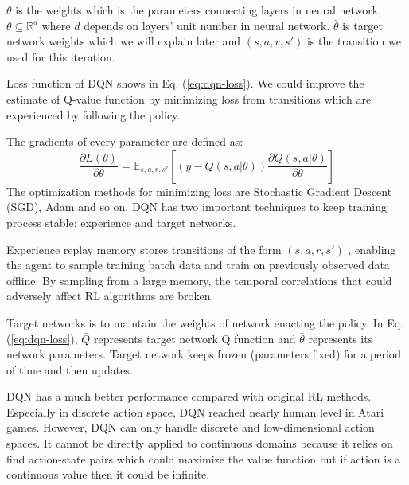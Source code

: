\documentclass[11pt,twocolumn]{jarticle} %
\begin{document}
$\theta$ is the weights which is the parameters connecting layers in neural network, $\theta \subseteq \mathbb{R}^d$ where $d$ depends on layers' unit number in neural network. $\bar{\theta}$ is target network weights which we will explain later and $(s,a,r,s')$ is the transition we used for this iteration. \par

Loss function of DQN shows in Eq. (\ref{eq:dqn-loss}). We could improve the estimate of Q-value function by minimizing loss from transitions which are experienced by following the policy. \par
The gradients of every parameter are defined as:
\begin{equation}
\frac{\partial L(\theta)}{\partial \theta} = \mathbb{E}_{s,a,r,s'}[(y - Q(s, a|\theta))\frac{\partial Q(s, a|\theta)}{\partial \theta}]
\end{equation}
The optimization methods for minimizing loss are Stochastic Gradient Descent (SGD), Adam\cite{adam} and so on.
DQN has two important techniques to keep training process stable: experience and target networks.\par
Experience replay\cite{replay} memory stores transitions of the form $(s,a,r,s')$ , enabling the agent to sample training batch data and train on previously observed data offline. By sampling from a large memory, the temporal correlations that could adversely affect RL algorithms are broken. \par
Target networks\cite{qlearning} is to maintain the weights of network enacting the policy. In Eq. (\ref{eq:dqn-loss}), $\bar{Q}$ represents target network Q function and $\bar{\theta}$ represents its network parameters. Target network keeps frozen (parameters fixed) for a period of time and then updates. \par

DQN has a much better performance compared with original RL methods. Especially in discrete action space, DQN reached nearly human level in Atari games. However, DQN can only handle discrete and low-dimensional action spaces. It cannot be directly applied to continuous domains because it relies on find action-state pairs which could maximize the value function but if action is a continuous value then it could be infinite. \par
\end{document}
